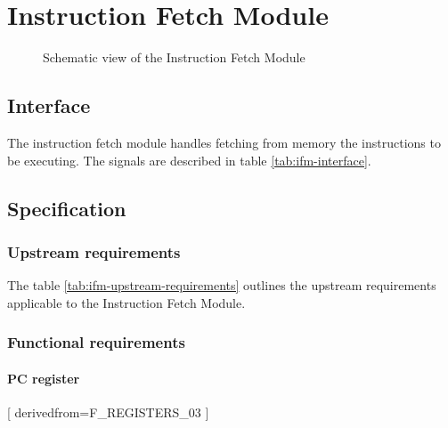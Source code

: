 \section{Instruction Fetch Module}

  \begin{figure}[h!]
      \centering
      
      \caption{Schematic view of the Instruction Fetch Module}
      \label{fig:ifm}
    \end{figure}

  \subsection{Interface}

    \begin{content}
        The instruction fetch module handles fetching from memory the instructions to be executing. The signals are described in table \ref{tab:ifm-interface}. 
      \end{content}

    

  \subsection{Specification}

    \subsubsection{Upstream requirements}

      The table \ref{tab:ifm-upstream-requirements} outlines the upstream requirements applicable to the Instruction Fetch Module.

      

    \subsubsection{Functional requirements}

      \paragraph{PC register}

      [
          derivedfrom=F\_REGISTERS\_03
        ]


